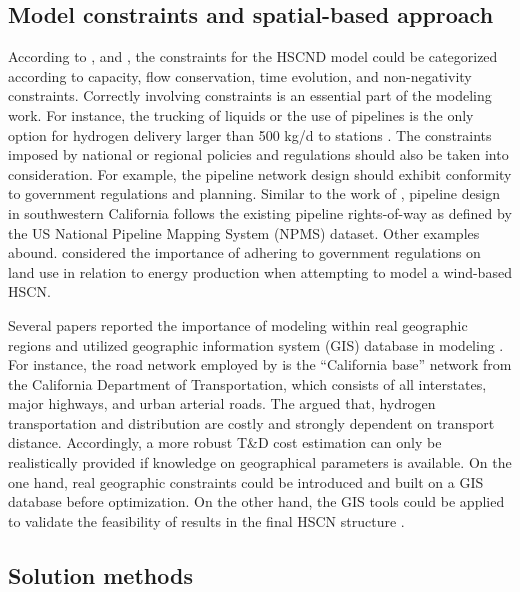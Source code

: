 \documentclass[11pt,3p]{elsarticle}
\begin{document}
\subsection{Model constraints and spatial-based approach}
\label{sec:constraints}

According to \citet{almansoori2009design}, and \citet{parker2010waste}, the constraints for the HSCND model could be categorized according to capacity, flow conservation, time evolution, and non-negativity constraints. Correctly involving constraints is an essential part of the modeling work. For instance, the trucking of liquids or the use of pipelines is the only option for hydrogen delivery larger than 500 kg/d to stations \citep{iea2015technology}. The constraints imposed by national or regional policies and regulations should also be taken into consideration. For example, the pipeline network design should exhibit conformity to government regulations and planning. Similar to the work of \citet{johnson2012spatially}, pipeline design in southwestern California follows the existing pipeline rights-of-way as defined by the US National Pipeline Mapping System (NPMS) dataset. Other examples abound. \citet{kim2017integrated} considered the importance of adhering to government regulations on land use in relation to energy production when attempting to model a wind-based HSCN. 

Several papers reported the importance of modeling within real geographic regions and utilized geographic information system (GIS) database in modeling \citep{almaraz2015deployment,johnson2012spatially,parker2010waste}. For instance, the road network employed by \citet{parker2010waste} is the ``California base'' network from the California Department of Transportation, which consists of all interstates, major highways, and urban arterial roads. The \citet{iea2015technology} argued that, hydrogen transportation and distribution are costly and strongly dependent on transport distance. Accordingly, a more robust T\&D cost estimation can only be realistically provided if knowledge on geographical parameters is available. On the one hand, real geographic constraints could be introduced and built on a GIS database before optimization. On the other hand, the GIS tools could be applied to validate the feasibility of results in the final HSCN structure \citep{almaraz2015deployment}.

\subsection{Solution methods}
\label{sec:solution}
\end{document}
